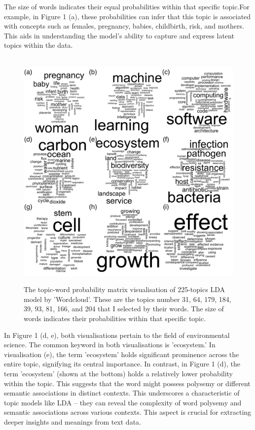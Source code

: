 \documentclass[12pt,twoside]{article}
\begin{document}
The size of words indicates their equal probabilities within that specific topic.For example, in Figure 1 (a), these probabilities can infer that this topic is associated with concepts such as females, pregnancy, babies, childbirth, risk, and mothers. This aids in understanding the model's ability to capture and express latent topics within the data.\\\\

\begin{figure}[htbp]
    \centering
    \includegraphics[width=14cm]{./figures/IMG_5754}\\[0.15cm] 
    \caption{The topic-word probability matrix visualisation of 225-topics LDA model by 'Wordcloud'. These are the topics number 31, 64, 179, 184, 39, 93, 81, 166, and 204 that I selected by their words. The size of words indicates their probabilities within that specific topic.}

\end{figure}

In Figure 1 (d, e), both visualisations pertain to the field of environmental science. The common keyword in both visualisations is 'ecosystem.' In visualisation (e), the term 'ecosystem' holds significant prominence across the entire topic, signifying its central importance. In contrast, in Figure 1 (d), the term 'ecosystem' (shown at the bottom) holds a relatively lower probability within the topic. This suggests that the word might possess polysemy or different semantic associations in distinct contexts. This underscores a characteristic of topic models like LDA – they can reveal the complexity of word polysemy and semantic associations across various contexts. This aspect is crucial for extracting deeper insights and meanings from text data.\\\\
\end{document}
